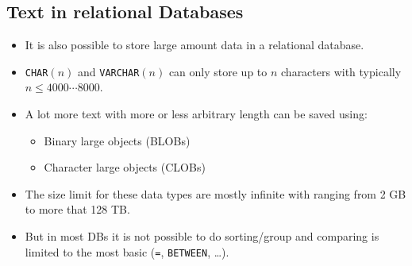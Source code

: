 		\subsection{Text in relational Databases} %
			\begin{itemize}
				\item It is also possible to store large amount data in a relational database.
				\item \lstinline|CHAR|\((n)\) and \lstinline|VARCHAR|\((n)\) can only store up to \(n\) characters with typically \( n \leq 4000\cdots8000 \).
				\item A lot more text with more or less arbitrary length can be saved using:
					\begin{itemize}
						\item Binary large objects (BLOBs)
						\item Character large objects (CLOBs)
					\end{itemize}
				\item The size limit for these data types are mostly infinite with ranging from 2 GB to more that 128 TB.
				\item But in most DBs it is not possible to do sorting/group and comparing is limited to the most basic (\lstinline|=|, \lstinline|BETWEEN|, \dots).
			\end{itemize}

